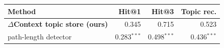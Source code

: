 \begin{tabular}{lrrr}
\toprule
Method & Hit@1 & Hit@3 & Topic rec. \\
\midrule
\textbf{$\Delta$Context topic store (ours)} & 0.345 & 0.715 & 0.523 \\
\quad path-length detector & 0.283$^{***}$ & 0.498$^{***}$ & 0.436$^{***}$ \\
\bottomrule
\end{tabular}

